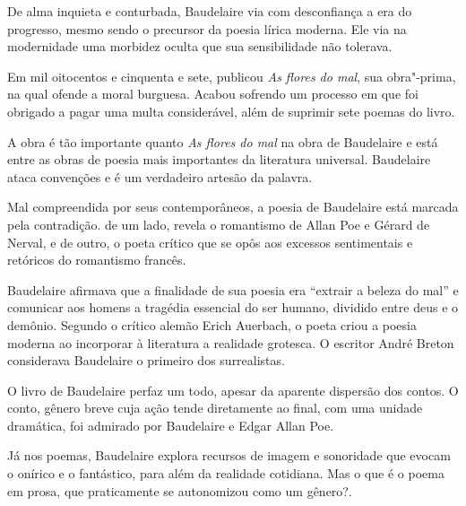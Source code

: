 \documentclass[12pt]{extarticle}
\begin{document}


De alma inquieta e conturbada, Baudelaire via com desconfiança a era do
progresso, mesmo sendo o precursor da poesia lírica moderna.
Ele via na modernidade uma morbidez oculta que sua sensibilidade não
tolerava.


 

Em mil oitocentos e cinquenta e sete, publicou \textit{As flores do mal},
sua obra"-prima, na qual ofende a moral burguesa. Acabou sofrendo um
processo em que foi obrigado a pagar uma multa considerável, além de
suprimir sete poemas do livro.

A obra é tão importante quanto \textit{As flores do mal} na obra de
Baudelaire e está entre as obras de poesia mais importantes da
literatura universal.
Baudelaire ataca convenções e é um verdadeiro artesão da palavra.

Mal compreendida por seus contemporâneos, a poesia de Baudelaire está
marcada pela contradição. de um lado, revela o romantismo de Allan Poe e
Gérard de Nerval, e de outro, o poeta crítico que se opôs aos excessos
sentimentais e retóricos do romantismo francês.

Baudelaire afirmava que a finalidade de sua poesia era ``extrair a
beleza do mal'' e comunicar aos homens a tragédia essencial do ser
humano, dividido entre deus e o demônio.
Segundo o crítico alemão Erich Auerbach, o poeta criou a poesia moderna
ao incorporar à literatura a realidade grotesca. O escritor André Breton
considerava Baudelaire o primeiro dos surrealistas.




O livro de Baudelaire perfaz um todo, apesar da aparente dispersão dos
contos.
O conto, gênero breve cuja ação tende diretamente ao final, com uma
unidade dramática, foi admirado por Baudelaire e Edgar Allan Poe.




Já nos poemas, Baudelaire explora recursos de imagem e sonoridade que
evocam o onírico e o fantástico, para além da realidade cotidiana.
Mas o que é o poema em prosa, que praticamente se autonomizou como um
gênero?.
\end{document}
